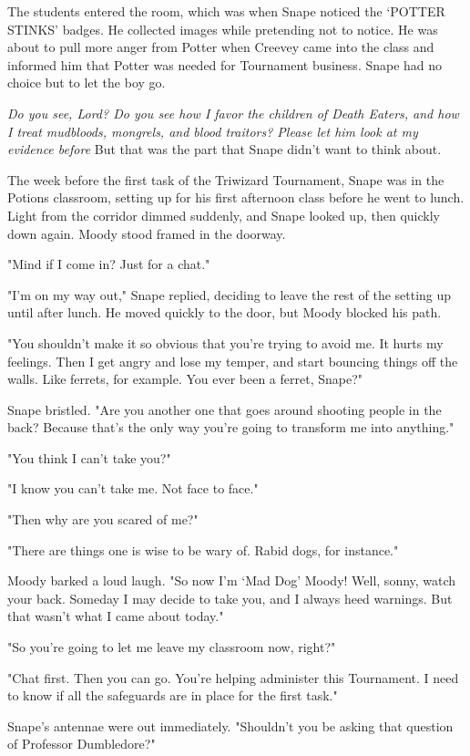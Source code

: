 The students entered the room, which was when Snape noticed the `POTTER STINKS' badges. He collected images while pretending not to notice. He was about to pull more anger from Potter when Creevey came into the class and informed him that Potter was needed for Tournament business. Snape had no choice but to let the boy go.

\emph{Do you see, Lord? Do you see how I favor the children of Death Eaters, and how I treat mudbloods, mongrels, and blood traitors? Please let him look at my evidence before{\el}} But that was the part that Snape didn't want to think about.

The week before the first task of the Triwizard Tournament, Snape was in the Potions classroom, setting up for his first afternoon class before he went to lunch. Light from the corridor dimmed suddenly, and Snape looked up, then quickly down again. Moody stood framed in the doorway.

"Mind if I come in? Just for a chat."

"I'm on my way out," Snape replied, deciding to leave the rest of the setting up until after lunch. He moved quickly to the door, but Moody blocked his path.

"You shouldn't make it so obvious that you're trying to avoid me. It hurts my feelings. Then I get angry and lose my temper, and start bouncing things off the walls. Like ferrets, for example. You ever been a ferret, Snape?"

Snape bristled. "Are you another one that goes around shooting people in the back? Because that's the only way you're going to transform me into anything."

"You think I can't take you?"

"I know you can't take me. Not face to face."

"Then why are you scared of me?"

"There are things one is wise to be wary of. Rabid dogs, for instance."

Moody barked a loud laugh. "So now I'm `Mad Dog' Moody! Well, sonny, watch your back. Someday I may decide to take you, and I always heed warnings. But that wasn't what I came about today."

"So you're going to let me leave my classroom now, right?"

"Chat first. Then you can go. You're helping administer this Tournament. I need to know if all the safeguards are in place for the first task."

Snape's antennae were out immediately. "Shouldn't you be asking that question of Professor Dumbledore?"

